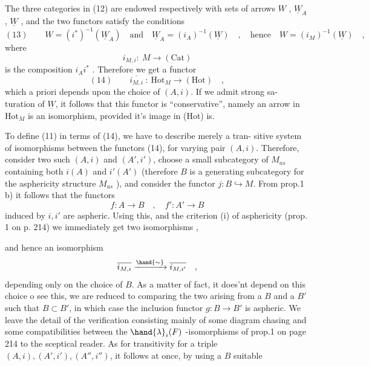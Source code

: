 
The three categories in (12) are endowed respectively with sets of arrows
$W$ , $\underline{W}_A$ , $\underline{W}$ , and the two functors satisfy the conditions
\[ (13) \qquad W = (i^{*})^{-1}(\underline{W}_A) \quad \text{and} \quad \underline{W}_A = (i_A)^{-1}(\underline{W}) \quad , \quad \text{hence} \quad W = (i_M)^{-1}(\underline{W}) \quad , \]
where
\[ i_{M,i}\colon \ M \longrightarrow (\mathrm{Cat}) \]
is the composition $i_A i^{*}$ . Therefore we get a functor
\[ (14) \qquad \overline{i_{M,i}} \ : \ \mathrm{Hot}_M \longrightarrow (\mathrm{Hot}) \quad , \]
which a priori depends upon the choice of $(A,i)$. If we admit strong sa-%
turation of $\underline{W}$, it follows that this functor is ``conservative'', namely
an arrow in $\mathrm{Hot}_M$ is an isomorphism, provided it's image in (Hot) is.

To define (11) in terms of (14), we have to describe merely a tran-%
sitive system of isomorphisms between the functors (14), for varying
pair $(A,i)$. Therefore, consider two such $(A,i)$ and $(A',i')$, choose
a small  subcategory  of $M_{as}$ containing both $i(A)$ and $i'(A')$ (therefore
$B$ is a generating subcategory for the asphericity structure $M_{as}$ ), and
consider the  functor $j\colon B \hookrightarrow M$. From prop.1 b) it follows
that the functors
\[ f\colon A \longrightarrow B \quad , \quad f' : A' \longrightarrow B \]
induced by $i,i'$ are aspheric. Using this, and the criterion (i) of
asphericity (prop. 1 on p. 214) we immediately get two isomorphisms
,

and hence an isomorphism
\[ \overline{i_{M,i}} \xrightarrow{\hand{\sim}} \overline{i_{M,i'}} \quad , \]
depending only on the choice of $B$. As a matter of fact, it does'nt
depend on this choice \hand{\unsure{$\leftarrow$}} o see this, we are reduced to comparing
the two  arising from a $B$ and a $B'$ such that $B \subset B'$, in 
which case the inclusion functor $g\colon B \to B'$ is aspheric. We leave the
detail of the verification\unsure{\deleted{,}} \hand{(}consisting mainly of some diagram chasing
and some compatibilities between the $\hand{\lambda}_i(F)$ -isomorphisms of prop.1 on
page 214\hand{)} to the sceptical reader. As for transitivity for a triple
$(A,i),(A',i'),(A'',i'')$, it  follows at once, by using a $B$ suitable  

